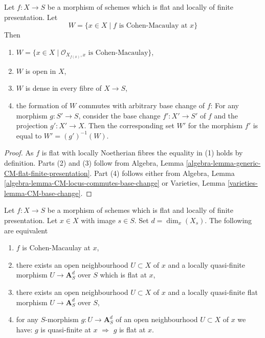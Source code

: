 \begin{lemma}
\label{lemma-flat-finite-presentation-CM-open}
\begin{reference}
\cite[IV Corollary 12.1.7(iii)]{EGA}
\end{reference}
Let $f : X \to S$ be a morphism of schemes which is flat and locally
of finite presentation. Let
$$
W = \{x \in X \mid f\text{ is Cohen-Macaulay at }x\}
$$
Then
\begin{enumerate}
\item $W = \{x \in X \mid \mathcal{O}_{X_{f(x)}, x}\text{ is Cohen-Macaulay}\}$,
\item $W$ is open in $X$,
\item $W$ is dense in every fibre of $X \to S$,
\item the formation of $W$ commutes with arbitrary base change of $f$:
For any morphism $g : S' \to S$, consider
the base change $f' : X' \to S'$ of $f$ and the
projection $g' : X' \to X$. Then the corresponding
set $W'$ for the morphism $f'$ is equal to $W' = (g')^{-1}(W)$.
\end{enumerate}
\end{lemma}

\begin{proof}
As $f$ is flat with locally Noetherian fibres the equality in (1) holds
by definition. Parts (2) and (3) follow from
Algebra, Lemma \ref{algebra-lemma-generic-CM-flat-finite-presentation}.
Part (4) follows either from
Algebra, Lemma \ref{algebra-lemma-CM-locus-commutes-base-change}
or
Varieties, Lemma \ref{varieties-lemma-CM-base-change}.
\end{proof}

\begin{lemma}
\label{lemma-flat-finite-presentation-characterize-CM}
Let $f : X \to S$ be a morphism of schemes which is flat and locally
of finite presentation. Let $x \in X$ with image $s \in S$.
Set $d = \dim_x(X_s)$.
The following are equivalent
\begin{enumerate}
\item $f$ is Cohen-Macaulay at $x$,
\item there exists an open neighbourhood $U \subset X$ of $x$
and a locally quasi-finite morphism $U \to \mathbf{A}^d_S$ over $S$
which is flat at $x$,
\item there exists an open neighbourhood $U \subset X$ of $x$
and a locally quasi-finite flat morphism $U \to \mathbf{A}^d_S$ over $S$,
\item for any $S$-morphism $g : U \to \mathbf{A}^d_S$
of an open neighbourhood $U \subset X$ of $x$ we have:
$g$ is quasi-finite at $x$ $\Rightarrow$ $g$ is flat at $x$.
\end{enumerate}
\end{lemma}

